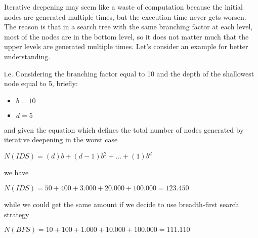 Iterative deepening may seem like a waste of computation because the initial nodes are generated multiple times, but the execution time never gets worsen. The reason 
is that in a search tree with the same branching factor at each level, most of the nodes are in the bottom level, so it does not matter much that the upper levels are generated
multiple times. Let's consider an example for better understanding.
\begin{example}
    i.e. Considering the branching factor equal to 10 and the depth of the shallowest node equal to 5, briefly: \vspace{3.5pt}
    \begin{center}
        \begin{itemize}
            \renewcommand{\labelitemi}{}
            \item $b = 10$
            \item $d = 5$
        \end{itemize}
    \end{center} \vspace{3.5pt}

    and given the equation which defines the total number of nodes generated by iterative deepening in the worst case \vspace{3.5pt}
    \begin{center}
        $N(IDS) = (d)b + (d - 1)b^2 + \dots + (1)b^d$        
    \end{center} \vspace{3.5pt}

    we have \vspace{3.5pt}
    \begin{center}
        $N(IDS) = 50 + 400 + 3.000 + 20.000 + 100.000 = 123.450$        
    \end{center} \vspace{3.5pt}

    while we could get the same amount if we decide to use breadth-first search strategy \vspace{3.5pt}
    \begin{center}
        $N(BFS) = 10 + 100 + 1.000 + 10.000 + 100.000 = 111.110$        
    \end{center} \vspace{3.5pt}
\end{example}
